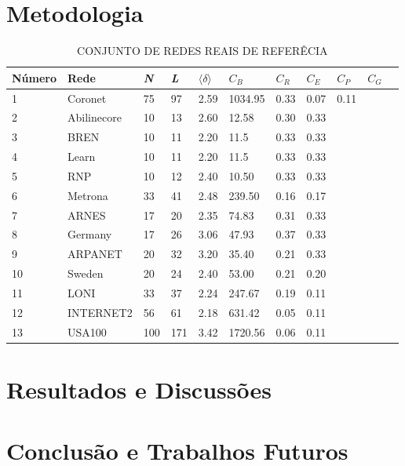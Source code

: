 \documentclass[12pt]{article}
\begin{document}
\section{Metodologia}
\begin{table}[htp]
\caption{CONJUNTO DE REDES REAIS DE REFERÊCIA}\label{tab:tab1}
\centering
\begin{tabular}{l*{9}{l}r}
\hline\rowcolor{Gray}
Número & Rede & \textit{N} & \textit{L} & $\langle \delta \rangle$ & $C_B$ & $C_R$ & $C_E$ & $C_P$ & $C_G$\\ 
\hline
1 & Coronet & 75 & 97 & 2.59& 1034.95& 0.33& 0.07 & 0.11\\ 
2 &  Abilinecore &  10 &  13& 2.60& 12.58 & 0.30 & 0.33\\
3 &  BREN &  10 &  11& 2.20& 11.5 & 0.33 & 0.33\\
4 &  Learn &  10 &  11& 2.20& 11.5& 0.33 & 0.33\\
5 &  RNP &  10 &  12& 2.40& 10.50&  0.33 & 0.33\\
6 &  Metrona &  33 &  41& 2.48& 239.50&  0.16 & 0.17\\
7 &  ARNES &  17 &  20& 2.35& 74.83&  0.31 & 0.33\\
8 &  Germany &  17 &  26& 3.06& 47.93& 0.37 & 0.33\\
9 &  ARPANET &  20 &  32& 3.20& 35.40&  0.21 & 0.33\\
10 &  Sweden &  20 &  24& 2.40& 53.00& 0.21 & 0.20\\
11 &  LONI &  33 &  37& 2.24& 247.67&  0.19 & 0.11\\
12 &  INTERNET2 &  56&  61& 2.18& 631.42&  0.05 & 0.11\\
13 &  USA100 &  100 &  171& 3.42& 1720.56&  0.06 & 0.11
\end{tabular}
\hline
\end{table}
\section{Resultados e Discussões}
\section{Conclusão e Trabalhos Futuros}



\end{document}
